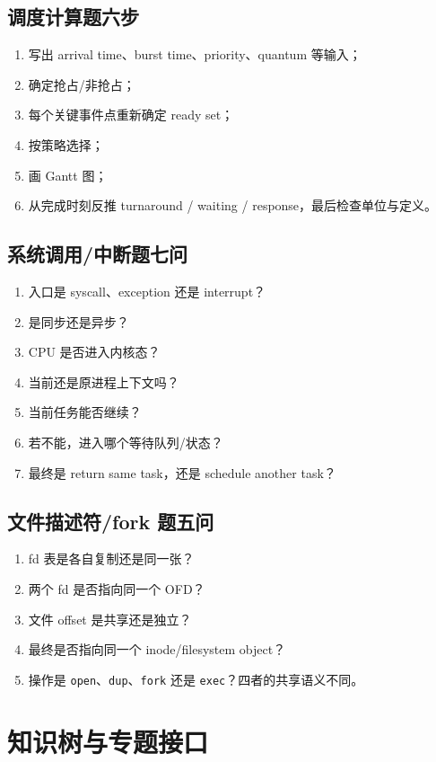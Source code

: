 \documentclass[11pt,a4paper]{ctexart}
\newcommand{\code}[1]{\texttt{#1}}
\begin{document}
\subsection{调度计算题六步}
\begin{enumerate}
\item 写出 arrival time、burst time、priority、quantum 等输入；
\item 确定抢占/非抢占；
\item 每个关键事件点重新确定 ready set；
\item 按策略选择；
\item 画 Gantt 图；
\item 从完成时刻反推 turnaround / waiting / response，最后检查单位与定义。
\end{enumerate}

\subsection{系统调用/中断题七问}
\begin{enumerate}
\item 入口是 syscall、exception 还是 interrupt？
\item 是同步还是异步？
\item CPU 是否进入内核态？
\item 当前还是原进程上下文吗？
\item 当前任务能否继续？
\item 若不能，进入哪个等待队列/状态？
\item 最终是 return same task，还是 schedule another task？
\end{enumerate}

\subsection{文件描述符/fork 题五问}
\begin{enumerate}
\item fd 表是各自复制还是同一张？
\item 两个 fd 是否指向同一个 OFD？
\item 文件 offset 是共享还是独立？
\item 最终是否指向同一个 inode/filesystem object？
\item 操作是 \code{open}、\code{dup}、\code{fork} 还是 \code{exec}？四者的共享语义不同。
\end{enumerate}

\section{知识树与专题接口}
\end{document}
